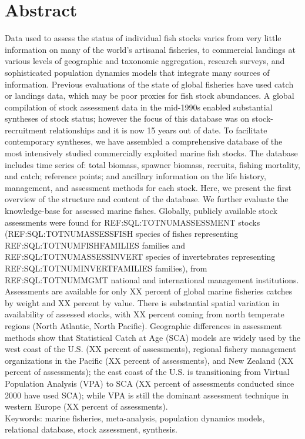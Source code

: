 \newpage
\section*{Abstract}

Data used to assess the status of individual fish stocks varies from
very little information on many of the world's artisanal fisheries, to
commercial landings at various levels of geographic and taxonomic
aggregation, research surveys, and sophisticated population dynamics
models that integrate many sources of information.  Previous
evaluations of the state of global fisheries have used catch or
landings data, which may be poor proxies for fish stock abundances. A
global compilation of stock assessment data in the mid-1990s enabled
substantial syntheses of stock status; however the focus of this
database was on stock-recruitment relationships and it is now 15 years
out of date. To facilitate contemporary syntheses, we have assembled a
comprehensive database of the most intensively studied commercially
exploited marine fish stocks. The database includes time series of:
total biomass, spawner biomass, recruits, fishing mortality, and
catch; reference points; and ancillary information on the life
history, management, and assessment methods for each stock.  Here, we
present the first overview of the structure and content of the
database. We further evaluate the knowledge-base for assessed marine
fishes. Globally, publicly available stock assessments were found for
REF:SQL:TOTNUMASSESSMENT stocks (REF:SQL:TOTNUMASSESSFISH species of
fishes representing REF:SQL:TOTNUMFISHFAMILIES families and
REF:SQL:TOTNUMASSESSINVERT species of invertebrates representing
REF:SQL:TOTNUMINVERTFAMILIES families), from REF:SQL:TOTNUMMGMT
national and international management institutions. Assessments are
available for only XX percent of global marine fisheries catches by
weight and XX percent by value.  There is substantial spatial
variation in availability of assessed stocks, with XX percent coming
from north temperate regions (North Atlantic, North Pacific).
Geographic differences in assessment methods show that Statistical
Catch at Age (SCA) models are widely used by the west coast of the
U.S. (XX percent of assessments), regional fishery management
organizations in the Pacific (XX percent of assessments), and New
Zealand (XX percent of assessments); the east coast of the U.S. is
transitioning from Virtual Population Analysis (VPA) to SCA (XX
percent of assessments conducted since 2000 have used SCA); while VPA
is still the dominant assessment
technique in western Europe (XX percent of assessments).\\

\noindent Keywords: marine fisheries, meta-analysis, population dynamics models, relational database, stock assessment, synthesis.
\newpage
